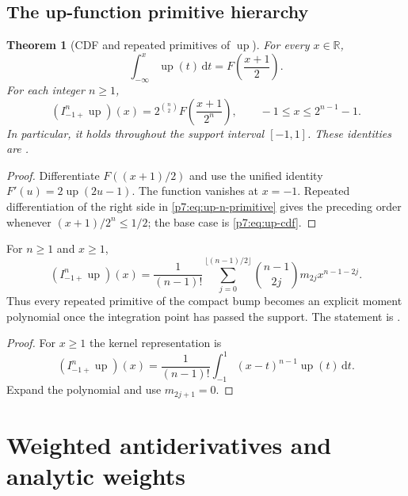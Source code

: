 \documentclass[11pt,oneside]{article}
\newtheorem{theorem}{Theorem}[section]
\theoremstyle{definition}
\theoremstyle{remark}
\newcommand{\Up}{\operatorname{up}}
\newcommand{\R}{\mathbb R}
\newcommand{\dd}{\,\mathrm d}
\newcommand{\1}{\mathbf 1}
\begin{document}
\subsection{The up-function primitive hierarchy}

\begin{theorem}[CDF and repeated primitives of $\Up$]
\label{p7:thm:up-primitives}
For every $x\in\R$,
\begin{equation}
 \int_{-\infty}^{x}\Up(t)\dd t=F\!\left(\frac{x+1}{2}\right).
 \label{p7:eq:up-cdf}
\end{equation}
For each integer $n\ge1$,
\begin{equation}
 (I_{-1+}^{n}\Up)(x)
 =2^{\binom n2}F\!\left(\frac{x+1}{2^n}\right),
 \qquad -1\le x\le 2^{n-1}-1.
 \label{p7:eq:up-n-primitive}
\end{equation}
In particular, it holds throughout the support interval $[-1,1]$.  These identities are
\statusproved.
\end{theorem}

\begin{proof}
Differentiate $F((x+1)/2)$ and use the unified identity
$F'(u)=2\Up(2u-1)$.  The function vanishes at $x=-1$.  Repeated differentiation of the
right side in \cref{p7:eq:up-n-primitive} gives the preceding order whenever
$(x+1)/2^n\le1/2$; the base case is \cref{p7:eq:up-cdf}.
\end{proof}

\begin{proposition}
\label{p7:prop:up-polynomial-tail}
For $n\ge1$ and $x\ge1$,
\begin{equation}
 (I_{-1+}^{n}\Up)(x)=\frac1{(n-1)!}
 \sum_{j=0}^{\lfloor(n-1)/2\rfloor}
 \binom{n-1}{2j}m_{2j}x^{n-1-2j}.
 \label{p7:eq:up-polynomial-tail}
\end{equation}
Thus every repeated primitive of the compact bump becomes an explicit moment polynomial once
the integration point has passed the support.  The statement is \statusproved.
\end{proposition}

\begin{proof}
For $x\ge1$ the kernel representation is
\[
 (I_{-1+}^{n}\Up)(x)=\frac1{(n-1)!}\int_{-1}^{1}(x-t)^{n-1}\Up(t)\dd t.
\]
Expand the polynomial and use $m_{2j+1}=0$.
\end{proof}

\section{Weighted antiderivatives and analytic weights}
\label{p7:sec:weighted}
\end{document}
